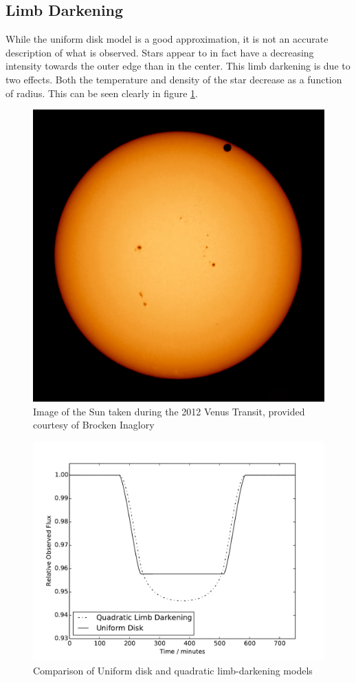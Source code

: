 \subsection{Limb Darkening}

While the uniform disk model is a good approximation, it is not an accurate description of what is observed. Stars appear to in fact have a decreasing intensity towards the outer edge than in the center. This limb darkening is due to two effects. Both the temperature and density of the star decrease as a function of radius. This can be seen clearly in figure \ref{fig:limb_darkening_image}.

\begin{figure}
    \centering
    \includegraphics[width=\columnwidth]{images/venus_transit.jpg}
    \caption{Image of the Sun taken during the 2012 Venus Transit, provided courtesy of Brocken Inaglory}
    \label{fig:limb_darkening_image}
\end{figure}

\begin{figure}
    \centering
    \includegraphics[width=\columnwidth]{images/model_comparison.pdf}
    \caption{Comparison of Uniform disk and quadratic limb-darkening models}
    \label{fig:model_comparison}
\end{figure}
